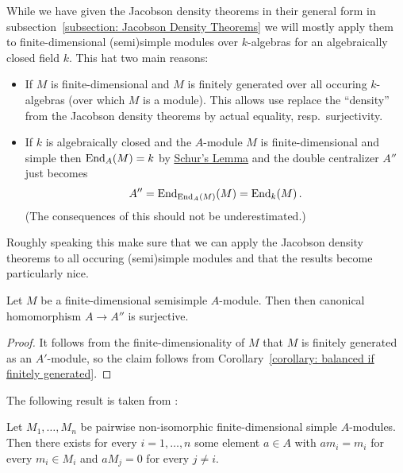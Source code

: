 \begin{fluff}
  While we have given the Jacobson density theorems in their general form in subsection~\ref{subsection: Jacobson Density Theorems} we will mostly apply them to finite-dimensional (semi)simple modules over $k$-algebras for an algebraically closed field $k$.
  This hat two main reasons:
  \begin{itemize}
    \item
      If $M$ is finite-dimensional and $M$ is finitely generated over all occuring $k$-algebras (over which $M$ is a module).
      This allows use replace the \enquote{density} from the Jacobson density theorems by actual equality, resp.\ surjectivity.
    \item
      If $k$ is algebraically closed and the $A$-module $M$ is finite-dimensional and simple then $\operatorname{End}_A(M) = k$ by \hyperref[proposition: schurs lemma for modules]{Schur’s Lemma} and the double centralizer $A''$ just becomes
      \[
          A''
        = \operatorname{End}_{\operatorname{End}_A(M)}(M)
        = \operatorname{End}_k(M) \,.
      \]
      (The consequences of this should not be underestimated.)
  \end{itemize}
  Roughly speaking this make sure that we can apply the Jacobson density theorems to all occuring (semi)simple modules and that the results become particularly nice.
\end{fluff}


\begin{lemma}
  \label{lemma: fd balanced are ss}
  Let $M$ be a finite-dimensional semisimple $A$-module.
  Then then canonical homomorphism $A \to A''$ is surjective.
\end{lemma}


\begin{proof}
  It follows from the finite-dimensionality of $M$ that $M$ is finitely generated as an $A'$-module, so the claim follows from Corollary~\ref{corollary: balanced if finitely generated}.
\end{proof}


\begin{fluff}
  The following result is taken from \cite[XVII, Theorem~3.7]{LangAlgebra2005}:
\end{fluff}


\begin{corollary}
  \label{corollary: existence of projection operators}
  Let $M_1, \dotsc, M_n$ be pairwise non-isomorphic finite-dimensional simple $A$-modules.
  Then there exists for every $i = 1, \dotsc, n$ some element $a \in A$ with $a m_i = m_i$ for every $m_i \in M_i$ and $a M_j = 0$ for every $j \neq i$.
\end{corollary}


